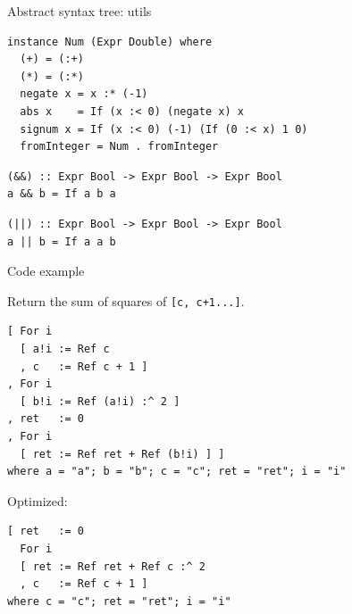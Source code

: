 \documentclass[handout]{beamer}
\begin{document}
\begin{frame}[fragile]{Abstract syntax tree: utils}

\begin{lstlisting}
instance Num (Expr Double) where
  (+) = (:+)
  (*) = (:*)
  negate x = x :* (-1)
  abs x    = If (x :< 0) (negate x) x
  signum x = If (x :< 0) (-1) (If (0 :< x) 1 0)
  fromInteger = Num . fromInteger
\end{lstlisting}

\begin{lstlisting}
(&&) :: Expr Bool -> Expr Bool -> Expr Bool
a && b = If a b a
\end{lstlisting}

\begin{lstlisting}
(||) :: Expr Bool -> Expr Bool -> Expr Bool
a || b = If a a b
\end{lstlisting}

\end{frame}

\begin{frame}[fragile]{Code example}

Return the sum of squares of {\tt [c, c+1...]}.

\begin{lstlisting}
[ For i
  [ a!i := Ref c
  , c   := Ref c + 1 ]
, For i
  [ b!i := Ref (a!i) :^ 2 ]
, ret   := 0
, For i
  [ ret := Ref ret + Ref (b!i) ] ]
where a = "a"; b = "b"; c = "c"; ret = "ret"; i = "i"
\end{lstlisting}

Optimized:

\begin{lstlisting}
[ ret   := 0
  For i
  [ ret := Ref ret + Ref c :^ 2
  , c   := Ref c + 1 ]
where c = "c"; ret = "ret"; i = "i"
\end{lstlisting}

\end{frame}
\end{document}
